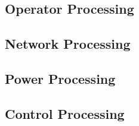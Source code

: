 \subsection{Operator Processing}
\label{loc:Capability_Operator}




\newpage
\subsection{Network Processing}
\label{loc:Capability_Network}




\newpage
\subsection{Power Processing}
\label{loc:Capability_Power}




\newpage
\subsection{Control Processing}
\label{loc:Capability_Control}

